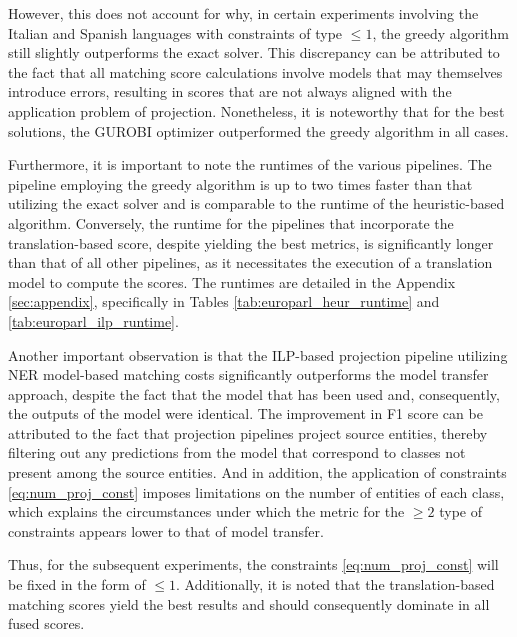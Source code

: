However, this does not account for why, in certain experiments involving the Italian and
Spanish languages with constraints of type \( \leq 1 \), the greedy algorithm still
slightly outperforms the exact solver. This discrepancy can be attributed to the fact that all
matching score calculations involve models that may themselves introduce errors,
resulting in scores that are not always aligned with the application problem of projection.
Nonetheless, it is noteworthy that for the best solutions, the GUROBI optimizer
outperformed the greedy algorithm in all cases.

Furthermore, it is important to note the runtimes of the various pipelines.
The pipeline employing the greedy algorithm is up to two times faster than that
utilizing the exact solver and is comparable to the runtime of the heuristic-based
algorithm. Conversely, the runtime for the pipelines that incorporate the
translation-based score, despite yielding the best metrics, is significantly longer
than that of all other pipelines, as it necessitates the execution of a translation
model to compute the scores. The runtimes are detailed in the Appendix \ref{sec:appendix}, specifically
in Tables \ref{tab:europarl_heur_runtime} and \ref{tab:europarl_ilp_runtime}.

Another important observation is that the ILP-based projection pipeline utilizing NER
model-based matching costs significantly outperforms the model transfer approach,
despite the fact that the model that has been used and, consequently, the outputs of the model
were identical. The improvement in F1 score can be attributed to the fact that projection
pipelines project source entities, thereby filtering out any predictions from the model
that correspond to classes not present among the source entities. And in addition, the
application of constraints \eqref{eq:num_proj_const} imposes limitations on the number
of entities of each class, which explains the circumstances under which the metric
for the \( \geq 2 \) type of constraints appears lower to that of model transfer.

Thus, for the subsequent experiments, the constraints \eqref{eq:num_proj_const} will
be fixed in the form of \( \leq 1 \). Additionally, it is noted that the translation-based
matching scores yield the best results and should consequently dominate in all fused scores.


